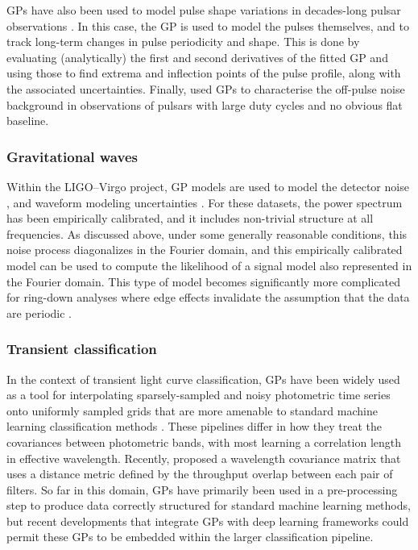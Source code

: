 \documentclass[letterpaper]{ar-1col}
\begin{document}
GPs have also been used to model pulse shape variations in decades-long pulsar observations \citep{2016MNRAS.456.1374B,2019MNRAS.488.5702B,2022MNRAS.513.5861S}.
In this case, the GP is used to model the pulses themselves, and to track long-term changes in pulse periodicity and shape.
This is done by evaluating (analytically) the first and second derivatives of the fitted GP and using those to find extrema and inflection points of the pulse profile, along with the associated uncertainties.
Finally, \citet{2021MNRAS.508.4249P} used GPs to characterise the off-pulse noise background in observations of pulsars with large duty cycles and no obvious flat baseline.

\subsubsection{Gravitational waves} Within the LIGO--Virgo project, GP models are used to model the detector noise \citep[e.g.][]{2020CQGra..37e5002A}, and waveform modeling uncertainties \citep{2016PhRvD..93f4001M}.
For these datasets, the power spectrum has been empirically calibrated, and it includes non-trivial structure at all frequencies.
As discussed above, under some generally reasonable conditions, this noise process diagonalizes in the Fourier domain, and this empirically calibrated model can be used to compute the likelihood of a signal model also represented in the Fourier domain.
This type of model becomes significantly more complicated for ring-down analyses where edge effects invalidate the assumption that the data are periodic \citep{2021arXiv210705609I}.

\subsubsection{Transient classification} In the context of transient light curve classification, GPs have been widely used as a tool for interpolating sparsely-sampled and noisy photometric time series onto uniformly sampled grids that are more amenable to standard machine learning classification methods \citep[e.g.][]{2016ApJS..225...31L, 2019AJ....158..257B, 2020ApJ...905...94V}.
These pipelines differ in how they treat the covariances between photometric bands, with most learning a correlation length in effective wavelength.
Recently, \citet{2021ApJS..255...24V} proposed a wavelength covariance matrix that uses a distance metric defined by the throughput overlap between each pair of filters.
So far in this domain, GPs have primarily been used in a pre-processing step to produce data correctly structured for standard machine learning methods, but recent developments that integrate GPs with deep learning frameworks could permit these GPs to be embedded within the larger classification pipeline.
\end{document}
